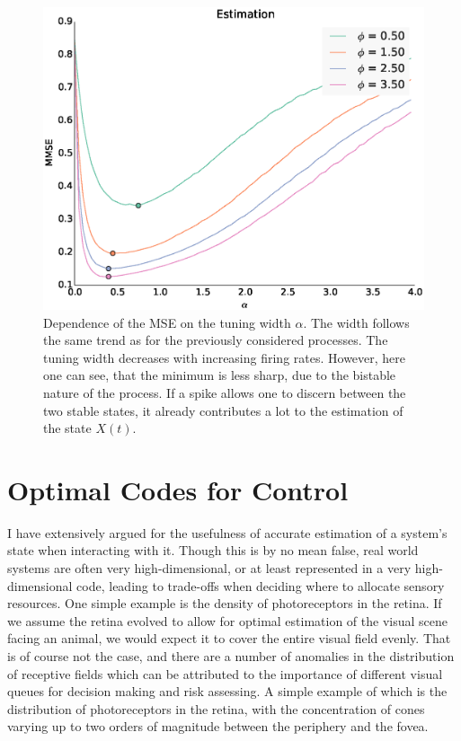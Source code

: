 \begin{figure}
\label{fig:bistable_optimal}
\includegraphics[width=\columnwidth]{figures/figure_5_12_a.eps}
\caption[MSE for the filtering of bistable processes.]{Dependence of the MSE on the tuning width $\alpha$. The width follows the same trend as for the previously considered processes.
The tuning width decreases with increasing firing rates. However, here one can see, that the minimum is less sharp, due to the bistable nature of the process. If a spike allows one
to discern between the two stable states, it already contributes a lot to the estimation of the state $X(t)$.}
\end{figure}

\section{Optimal Codes for Control}

\label{sec:optimal_code_control}

I have extensively argued for the usefulness of accurate estimation of a system's state when interacting with it. Though this is by no mean false, real world
systems are often very high-dimensional, or at least represented in a very high-dimensional code, leading to trade-offs when deciding where to allocate sensory
resources. One simple example is the density of photoreceptors in the retina. If we assume the retina evolved to allow for optimal estimation of the visual scene
facing an animal, we would expect it to cover the entire visual field evenly. That is of course not the case, and there are a number of anomalies in the distribution
of receptive fields which can be attributed to the importance of different visual queues for decision making and risk assessing. A simple example of which is the distribution of photoreceptors in the retina, with the concentration of cones varying up to two orders of magnitude between the periphery and the fovea.
\par

